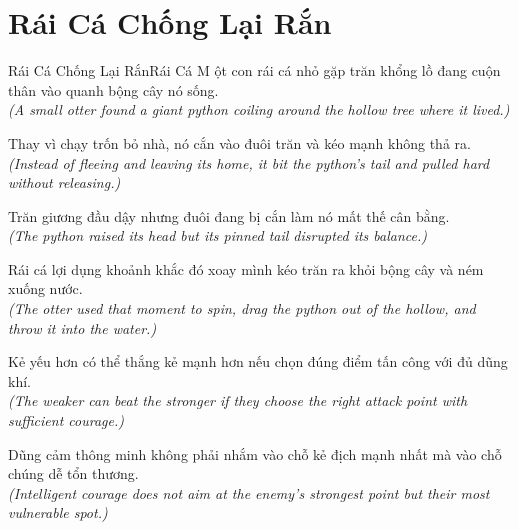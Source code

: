 \section{Rái Cá Chống Lại Rắn}
\begin{truyen}{Rái Cá Chống Lại Rắn}{Rái Cá}
M ột con rái cá nhỏ gặp trăn khổng lồ đang cuộn thân vào quanh bộng cây nó sống.\\
\textit{(A small otter found a giant python coiling around the hollow tree where it lived.)}

Thay vì chạy trốn bỏ nhà, nó cắn vào đuôi trăn và kéo mạnh không thả ra.\\
\textit{(Instead of fleeing and leaving its home, it bit the python's tail and pulled hard without releasing.)}

Trăn giương đầu dậy nhưng đuôi đang bị cắn làm nó mất thế cân bằng.\\
\textit{(The python raised its head but its pinned tail disrupted its balance.)}

Rái cá lợi dụng khoảnh khắc đó xoay mình kéo trăn ra khỏi bộng cây và ném xuống nước.\\
\textit{(The otter used that moment to spin, drag the python out of the hollow, and throw it into the water.)}

Kẻ yếu hơn có thể thắng kẻ mạnh hơn nếu chọn đúng điểm tấn công với đủ dũng khí.\\
\textit{(The weaker can beat the stronger if they choose the right attack point with sufficient courage.)}

\end{truyen}
\begin{baihoc}
  Dũng cảm thông minh không phải nhắm vào chỗ kẻ địch mạnh nhất mà vào chỗ chúng dễ tổn thương.\\
  \textit{(Intelligent courage does not aim at the enemy's strongest point but their most vulnerable spot.)}
\end{baihoc}


